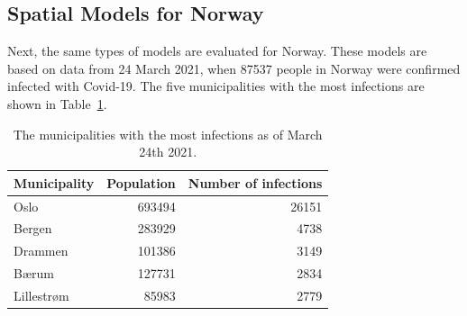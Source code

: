 \subsection{Spatial Models for Norway}
Next, the same types of models are evaluated for Norway. These models are based on data from 24 March 2021, when 87537 people in Norway were confirmed infected with Covid-19. The five municipalities with the most infections are shown in Table~\ref{top5norway}.
\begin{table}[H] 
\caption{The municipalities with the most infections as of March 24th 2021. \label{top5norway}}
\begin{tabular}{l r r}
\toprule
\textbf{Municipality}	& \textbf{Population}	& \textbf{Number of infections} \\
\midrule
Oslo & 693494 & 26151 \\
Bergen & 283929 & 4738 \\
Drammen & 101386 & 3149 \\
Bærum & 127731 & 2834 \\
Lillestrøm & 85983 & 2779 \\
\bottomrule
\end{tabular}
\end{table}
